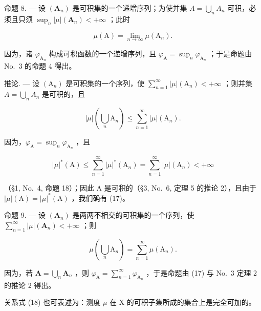 命题 8. --- 设 \((\mathbf{A}_{n})\) 是可积集的一个递增序列；为使并集 \(A = \bigcup_{n} A_{n}\) 可积，必须且只须 \(\sup_{n} |\mu|(\mathbf{A}_{n}) < +\infty\) ；此时

\[
\mu (\mathrm{A}) = \lim _ {n \rightarrow \infty} \mu (\mathrm{A} _ {n}).\tag{16}
\]

因为，诸 \(\varphi_{\mathrm{A}_n}\) 构成可积函数的一个递增序列，且 \(\varphi_{\mathrm{A}} = \sup_n \varphi_{\mathrm{A}_n}\) ；于是命题由 No.~3 的命题 4 得出。

推论. --- 设 \((\mathrm{A}_{n})\) 是可积集的一个序列，使 \(\sum_{n=1}^{\infty} |\mu|(\mathrm{A}_{n}) < +\infty\) ；则并集 \(A = \bigcup_{n} A_{n}\) 是可积的，且

\[
| \mu | \left(\bigcup_ {n} \mathrm{A} _ {n}\right) \leqslant \sum_ {n = 1} ^ {\infty} | \mu | (\mathrm{A} _ {n}).\tag{17}
\]

因为，\(\varphi_{\mathrm{A}} = \sup_n\varphi_{\mathrm{A}_n}\) ，且

\[
| \mu | ^ {*} (\mathrm{A}) \leqslant \sum_ {n = 1} ^ {\infty} | \mu | ^ {*} (\mathrm{A} _ {n}) = \sum_ {n = 1} ^ {\infty} | \mu | (\mathrm{A} _ {n}) <   + \infty
\]

（§1, No.~4, 命题 18）；因此 A 是可积的（§3, No.~6, 定理 5 的推论 2），且由于 \(|\mu|(\mathrm{A}) = |\mu|^*(\mathrm{A})\) ，我们确有 (17)。

命题 9. --- 设 \((\mathbf{A}_{n})\) 是两两不相交的可积集的一个序列，使 \(\sum_{n=1}^{\infty}|\mu|(\mathbf{A}_{n})<+\infty\) ；则

\[
\mu \left(\bigcup_ {n} \mathrm{A} _ {n}\right) = \sum_ {n = 1} ^ {\infty} \mu (\mathrm{A} _ {n}).\tag{18}
\]

因为，若 \(\mathbf{A} = \bigcup_{n}\mathbf{A}_{n}\) ，则 \(\varphi_{\mathrm{A}} = \sum_{n = 1}^{\infty}\varphi_{\mathrm{A}_n}\) ，于是命题由 (17) 与 No.~3 定理 2 的推论 2 得出。

关系式 (18) 也可表述为：测度 \(\mu\) 在 X 的可积子集所成的集合上是完全可加的。

